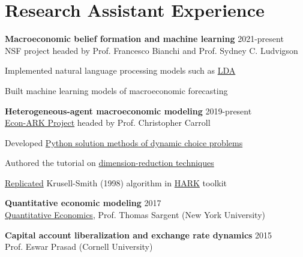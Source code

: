 
\section{Research Assistant Experience} %
\label{sec:research_exper}
\vspace{-0.25in}
\begin{outerlist}
		\item {\bf Macroeconomic belief formation and machine learning}  \hfill 2021-present\\
	NSF project headed by Prof. Francesco Bianchi and Prof. Sydney C. Ludvigson
	\begin{innerlist}
		\item Implemented natural language processing models such as \href{https://github.com/iworld1991/LDA/blob/main/notebook/LDA-example.ipynb}{LDA}
		\item Built machine learning models of macroeconomic forecasting
	\end{innerlist}
	\item {\bf Heterogeneous-agent macroeconomic modeling} \hfill 2019-present\\
	\href{https://econ-ark.org}{Econ-ARK Project} headed by Prof. Christopher Carroll
	\begin{innerlist}
		\item Developed \href{https://github.com/llorracc/SolvingMicroDSOPs/blob/master/Code/Python/SolvingMicroDSOP-Python.ipynb}{Python solution methods of dynamic choice problems}
		\item Authored the tutorial on \href{https://github.com/econ-ark/HARK/tree/BayerLuetticke-Mridul-Back-To/HARK/BayerLuetticke}{dimension-reduction techniques} 
		\item \href{https://github.com/econ-ark/KrusellSmith}{Replicated} Krusell-Smith (1998) algorithm in \href{https://github.com/econ-ark/HARK}{HARK} toolkit
	\end{innerlist}
	
	\item {\bf Quantitative economic modeling } \hfill 2017 \\
	\href{https://quantecon.org}{Quantitative Economics}, Prof. Thomas Sargent (New York University)
	
	
	\item {\bf Capital account liberalization and exchange rate dynamics} \hfill 2015 \\
	Prof. Eswar Prasad (Cornell University)
\end{outerlist}